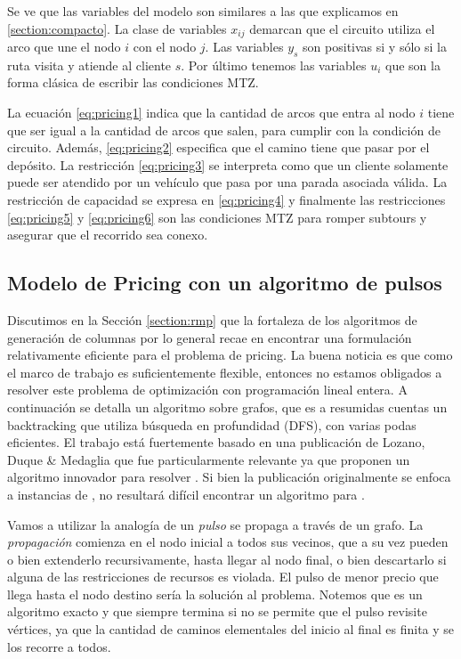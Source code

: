 Se ve que las variables del modelo son similares a las que explicamos en \ref{section:compacto}. La clase de variables $x_{ij}$ demarcan que el circuito utiliza el arco que une el nodo $i$ con el nodo $j$. Las variables $y_s$ son positivas si y sólo si la ruta visita y atiende al cliente $s$. Por último tenemos las variables $u_i$ que son la forma clásica de escribir las condiciones MTZ.

La ecuación \ref{eq:pricing1} indica que la cantidad de arcos que entra al nodo $i$ tiene que ser igual a la cantidad de arcos que salen, para cumplir con la condición de circuito. Además, \ref{eq:pricing2} especifica que el camino tiene que pasar por el depósito. La restricción \ref{eq:pricing3} se interpreta como que un cliente solamente puede ser atendido por un vehículo que pasa por una parada asociada válida. La restricción de capacidad se expresa en \ref{eq:pricing4} y finalmente las restricciones \ref{eq:pricing5} y \ref{eq:pricing6} son las condiciones MTZ para romper subtours y asegurar que el recorrido sea conexo.

\subsection{Modelo de Pricing con un algoritmo de pulsos}
\label{section:pricing-pulses}

Discutimos en la Sección \ref{section:rmp} que la fortaleza de los algoritmos de generación de columnas por lo general recae en encontrar una formulación relativamente eficiente para el problema de pricing. La buena noticia es que como el marco de trabajo es suficientemente flexible, entonces no estamos obligados a resolver este problema de optimización con programación lineal entera. A continuación se detalla un algoritmo sobre grafos, que es a resumidas cuentas un backtracking que utiliza búsqueda en profundidad (DFS), con varias podas eficientes. El trabajo está fuertemente basado en una publicación de Lozano, Duque \& Medaglia \cite{lozano-duque-medaglia} que fue particularmente relevante ya que proponen un algoritmo innovador para resolver . Si bien la publicación originalmente se enfoca a instancias de , no resultará difícil encontrar un algoritmo para .

Vamos a utilizar la analogía de un \emph{pulso} se propaga a través de un grafo. La \emph{propagación} comienza en el nodo inicial a todos sus vecinos, que a su vez pueden o bien extenderlo recursivamente, hasta llegar al nodo final, o bien descartarlo si alguna de las restricciones de recursos es violada. El pulso de menor precio que llega hasta el nodo destino sería la solución al problema. Notemos que es un algoritmo exacto y que siempre termina si no se permite que el pulso revisite vértices, ya que la cantidad de caminos elementales del inicio al final es finita y se los recorre a todos. 

